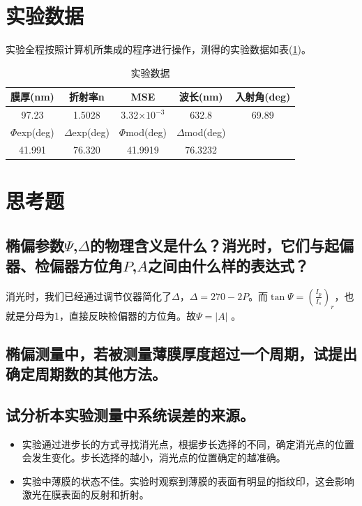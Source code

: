 \documentclass[a4paper]{article}
\begin{document}
\section{实验数据}
实验全程按照计算机所集成的程序进行操作，测得的实验数据如表(\ref{data})。
\begin{table}[!h]
\centering
\caption{实验数据}
\label{data}
\begin{tabular}{|c|c|c|c|c|}
\hline
膜厚(nm)         & 折射率n             & MSE            & 波长(nm)           & 入射角(deg) \\ \hline
97.23         & 1.5028           & 3.32$\times 10^{-3}$      & 632.8            & 69.89    \\ \hline
$\Phi$exp(deg) & $\Delta$exp(deg) & $\Phi$mod(deg) & $\Delta$mod(deg) &          \\ \hline
41.991         & 76.320           & 41.9919        & 76.3232	          &          \\ \hline
\end{tabular}
\end{table}


\section{思考题}
\subsection{椭偏参数$\Psi$,$\Delta$的物理含义是什么？消光时，它们与起偏器、检偏器方位角$P$,$A$之间由什么样的表达式？}
消光时，我们已经通过调节仪器简化了$\Delta$，$\Delta = 270 - 2P$。而$\tan\varPsi = (\frac{I_p}{I_s})_{r}$，也就是分母为1，直接反映检偏器的方位角。故$\varPsi =\left\lvert A \right\rvert$ 。
\subsection{椭偏测量中，若被测量薄膜厚度超过一个周期，试提出确定周期数的其他方法。}

\subsection{试分析本实验测量中系统误差的来源。}
\begin{itemize}
    \item 实验通过进步长的方式寻找消光点，根据步长选择的不同，确定消光点的位置会发生变化。步长选择的越小，消光点的位置确定的越准确。
    \item 实验中薄膜的状态不佳。实验时观察到薄膜的表面有明显的指纹印，这会影响激光在膜表面的反射和折射。
\end{itemize}

\nocite{jiaocai}

\end{document}
